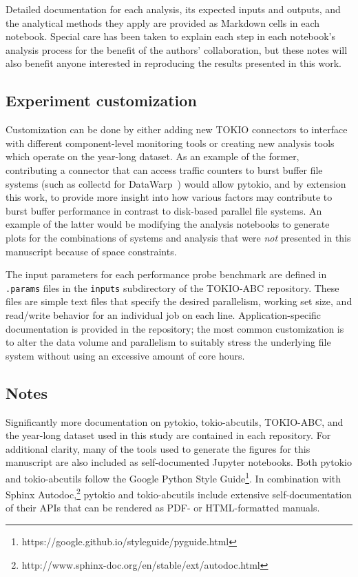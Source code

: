 Detailed documentation for each analysis, its expected inputs and outputs, and the analytical methods they apply are provided as Markdown cells in each notebook.
Special care has been taken to explain each step in each notebook's analysis process for the benefit of the authors' collaboration, but these notes will also benefit anyone interested in reproducing the results presented in this work.

\subsection{Experiment customization}

Customization can be done by either adding new TOKIO connectors to interface with different component-level monitoring tools or creating new analysis tools which operate on the year-long dataset.
As an example of the former, contributing a connector that can access traffic counters to burst buffer file systems (such as collectd for DataWarp~\cite{Lockwood2018tokio}) would allow pytokio, and by extension this work, to provide more insight into how various factors may contribute to burst buffer performance in contrast to disk-based parallel file systems.
An example of the latter would be modifying the analysis notebooks to generate plots for the combinations of systems and analysis that were \emph{not} presented in this manuscript because of space constraints.

The input parameters for each performance probe benchmark are defined in \texttt{.params} files in the \texttt{inputs} subdirectory of the TOKIO-ABC repository.
These files are simple text files that specify the desired parallelism, working set size, and read/write behavior for an individual job on each line.
Application-specific documentation is provided in the repository; the most common customization is to alter the data volume and parallelism to suitably stress the underlying file system without using an excessive amount of core hours.

\subsection{Notes}

Significantly more documentation on pytokio, tokio-abcutils, TOKIO-ABC, and the year-long dataset used in this study are contained in each repository.
For additional clarity, many of the tools used to generate the figures for this manuscript are also included as self-documented Jupyter notebooks.
Both pytokio and tokio-abcutils follow the Google Python Style Guide\footnote{https://google.github.io/styleguide/pyguide.html}.
In combination with Sphinx Autodoc,\footnote{http://www.sphinx-doc.org/en/stable/ext/autodoc.html} pytokio and tokio-abcutils include extensive self-documentation of their APIs that can be rendered as PDF- or HTML-formatted manuals.